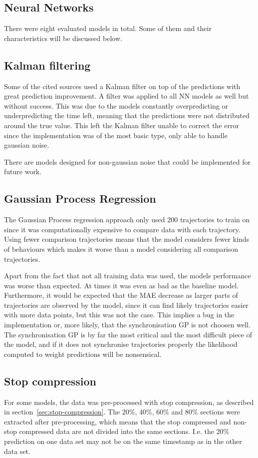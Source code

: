 \subsection{Neural Networks}
There were eight evaluated models in total. Some of them and their characteristics will be discussed below.

\subsection{Kalman filtering}
Some of the cited sources used a Kalman filter on top of the predictions with great prediction improvement. A filter was applied to all NN models as well but without success. This was due to the models constantly overpredicting or underpredicting the time left, meaning that the predictions were not distributed around the true value. This left the Kalman filter unable to correct the error since the implementation was of the most basic type, only able to handle gaussian noise. 

There are models designed for non-gaussian noise that could be implemented for future work.

\subsection{Gaussian Process Regression}
The Gaussian Process regression approach only used 200 trajectories to train on since it was computationally expensive to compare data with each trajectory. Using fewer comparison trajectories means that the model considers fewer kinds of behaviours which makes it worse than a model considering all comparison trajectories.

Apart from the fact that not all training data was used, the models performance was worse than expected. At times it was even as bad as the baseline model. Furthermore, it would be expected that the MAE decrease as larger parts of trajectories are observed by the model, since it can find likely trajectories easier with more data points, but this was not the case. This implies a bug in the implementation or, more likely, that the synchronisation GP is not choosen well. The synchronisation GP is by far the most critical and the most difficult piece of the model, and if it does not synchronise trajectories properly the likelihood computed to weight predictions will be nonsensical.

\subsection{Stop compression}
For some models, the data was pre-processed with stop compression, as described in section~\ref{sec:stop-compression}. The 20\%, 40\%, 60\% and 80\% sections were extracted after pre-processing, which means that the stop compressed and non-stop compressed data are not divided into the same sections. I.e. the 20\% prediction on one data set may not be on the same timestamp as in the other data set.

